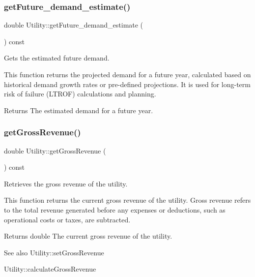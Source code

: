 \subsubsection{\texorpdfstring{get\+Future\+\_\+demand\+\_\+estimate()}{getFuture\_demand\_estimate()}}
{\footnotesize\ttfamily double Utility\+::get\+Future\+\_\+demand\+\_\+estimate (\begin{DoxyParamCaption}{ }\end{DoxyParamCaption}) const}



Gets the estimated future demand. 

This function returns the projected demand for a future year, calculated based on historical demand growth rates or pre-\/defined projections. It is used for long-\/term risk of failure (L\+T\+R\+OF) calculations and planning.

\begin{DoxyReturn}{Returns}
The estimated demand for a future year. 
\end{DoxyReturn}
\mbox{\label{classUtility_a2903344b317f0949014c687d285b64b6}} 
\subsubsection{\texorpdfstring{get\+Gross\+Revenue()}{getGrossRevenue()}}
{\footnotesize\ttfamily double Utility\+::get\+Gross\+Revenue (\begin{DoxyParamCaption}{ }\end{DoxyParamCaption}) const}



Retrieves the gross revenue of the utility. 

This function returns the current gross revenue of the utility. Gross revenue refers to the total revenue generated before any expenses or deductions, such as operational costs or taxes, are subtracted.

\begin{DoxyReturn}{Returns}
double The current gross revenue of the utility.
\end{DoxyReturn}
\begin{DoxySeeAlso}{See also}
Utility\+::set\+Gross\+Revenue 

Utility\+::calculate\+Gross\+Revenue 
\end{DoxySeeAlso}
\mbox{\label{classUtility_abe05c15d0ea2efec00c00a8ee418b53b}} 
